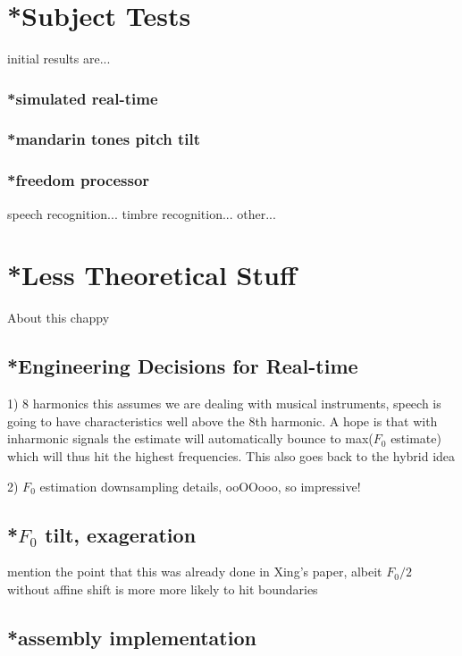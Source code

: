 \documentclass [11pt, proquest] {uwthesis}[2015/03/03]
\begin{document}

\chapter{*Subject Tests}
initial results are...


	\subsection{*simulated real-time}
	
	\subsection{*mandarin tones pitch tilt}
	
	\subsection{*freedom processor}
		speech recognition...
		timbre recognition...
		other...


 
\chapter{*Less Theoretical Stuff}

About this chappy

\section{*Engineering Decisions for Real-time}

1) 8 harmonics
this assumes we are dealing with musical instruments, speech is going to have characteristics well above the 8th harmonic.  A hope is that with inharmonic signals the estimate will automatically bounce to max($F_0$ estimate) which will thus hit the highest frequencies.  This also goes back to the hybrid idea


2) $F_0$ estimation downsampling details, ooOOooo, so impressive!

\section{*$F_0$ tilt, exageration}

mention the point that this was already done in Xing's paper, albeit $F_0/2$ without affine shift is more more likely to hit boundaries 

\section{*assembly implementation}
\end{document}
